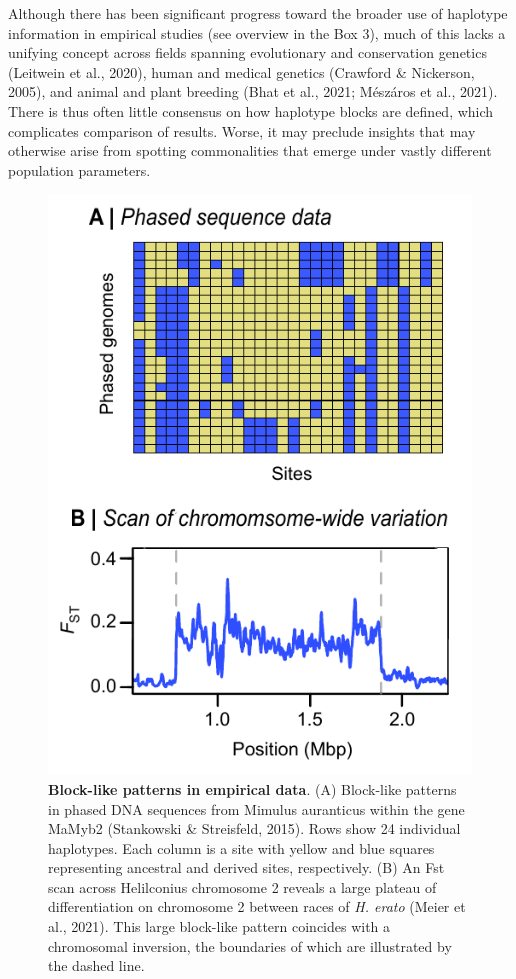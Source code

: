 \documentclass[twocolumn]{bmcart}%
\begin{document}
Although there has been significant progress toward the broader use of haplotype information in empirical studies (see overview in the Box 3), much of this lacks a unifying concept across fields spanning evolutionary and conservation genetics (Leitwein et al., 2020), human and medical genetics (Crawford \& Nickerson, 2005), and animal and plant breeding (Bhat et al., 2021; Mészáros et al., 2021). There is thus often little consensus on how haplotype blocks are defined, which complicates comparison of results. Worse, it may preclude insights that may otherwise arise from spotting commonalities that emerge under vastly different population parameters.

\begin{figure}
    \includegraphics[width=0.89\linewidth]{Figure_1.pdf}
    \caption{\footnotesize{\textbf{Block-like patterns in empirical data}. (A) Block-like patterns in phased DNA sequences from Mimulus auranticus within the gene MaMyb2 (Stankowski \& Streisfeld, 2015). Rows show 24 individual haplotypes. Each column is a site with yellow and blue squares representing ancestral and derived sites, respectively. (B) An Fst scan across Helilconius chromosome 2 reveals a large plateau of differentiation on chromosome 2 between races of \textit{H. erato} (Meier et al., 2021). This large block-like pattern coincides with a chromosomal inversion, the boundaries of which are illustrated by the dashed line.}}
    \label{fig:1}
\end{figure}
\end{document}
